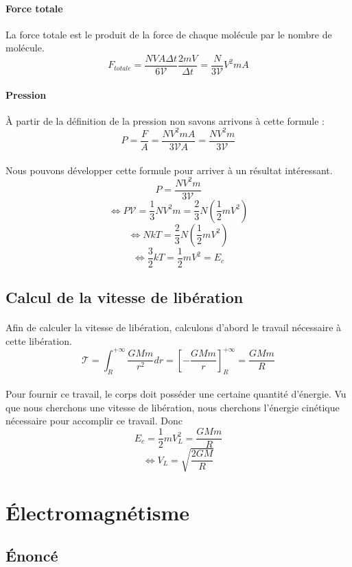 \documentclass[a4paper]{article}
\begin{document}
\paragraph{Force totale}La force totale est le produit de la force de chaque molécule par le nombre de molécule.
\[F_{totale}=\frac{NVA\Delta t}{6\mathscr{V}}\frac{2mV}{\Delta t}=\frac{N}{3\mathscr{V}}V^2mA\]
\paragraph{Pression}À partir de la définition de la pression non savons arrivons à cette formule :
\[P=\frac{F}{A}=\frac{NV^2mA}{3\mathscr{V}A}=\frac{NV^2m}{3\mathscr{V}}\]
\paragraph{}Nous pouvons développer cette formule pour arriver à un résultat intéressant.
\[P=\frac{NV^2m}{3\mathscr{V}}\]
\[\Leftrightarrow P\mathscr{V}=\frac{1}{3}NV^2m=\frac{2}{3}N\left(\frac{1}{2}mV^2\right)\]
\[\Leftrightarrow NkT=\frac{2}{3}N\left(\frac{1}{2}mV^2\right)\]
\[\Leftrightarrow \frac{3}{2}kT=\frac{1}{2}mV^2=E_c\]
\subsection{Calcul de la vitesse de libération}
\paragraph{}Afin de calculer la vitesse de libération, calculons d'abord le travail nécessaire à cette libération.
\[\mathscr{T}=\int_R^{+\infty}\frac{GMm}{r^2}dr=\left[-\frac{GMm}{r}\right]_R^{+\infty}=\frac{GMm}{R}\]
\paragraph{}Pour fournir ce travail, le corps doit posséder une certaine quantité d'énergie. Vu que nous cherchons une vitesse de libération, nous cherchons l'énergie cinétique nécessaire pour accomplir ce travail. Donc
\[E_c=\frac{1}{2}mV_L^2=\frac{GMm}{R}\]
\[\Leftrightarrow V_L=\sqrt{\frac{2GM}{R}}\]
\section{Électromagnétisme}
\subsection{Énoncé}
\end{document}
